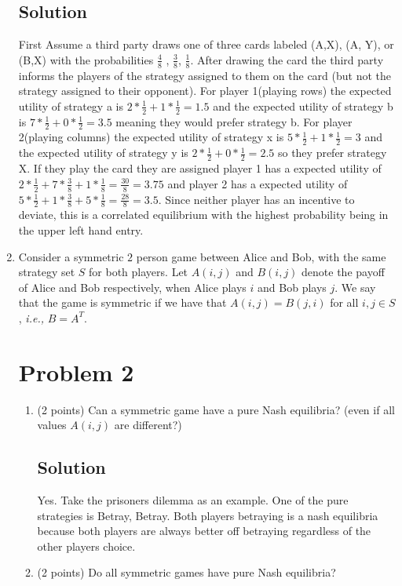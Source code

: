 \documentclass[11pt]{article}
\begin{document}
\begin{enumerate}
\subsection{Solution}
First Assume a third party draws one of three cards labeled (A,X), (A, Y), or (B,X) with the probabilities $\frac{4}{8}$ , $\frac{3}{8}$, $\frac{1}{8}$. After drawing the card the third party informs the players of the strategy assigned to them on the card (but not the strategy assigned to their opponent). For player 1(playing rows) the expected utility of strategy a is $2*\frac{1}{2} + 1*\frac{1}{2} = 1.5$ and the expected utility of strategy b is $7*\frac{1}{2} + 0*\frac{1}{2} = 3.5$ meaning they would prefer strategy b. For player 2(playing columns) the expected utility of strategy x is $5*\frac{1}{2} + 1*\frac{1}{2} = 3$ and the expected utility of strategy y is $2*\frac{1}{2} + 0*\frac{1}{2} = 2.5$ so they prefer strategy X. If they play the card they are assigned player 1 has a expected utility of $2*\frac{1}{2} + 7*\frac{3}{8} + 1*\frac{1}{8} = \frac{30}{8} = 3.75$ and player 2 has a expected utility of $5*\frac{1}{2} + 1*\frac{3}{8} + 5*\frac{1}{8} = \frac{28}{8} = 3.5$. Since neither player has an incentive to deviate, this is a correlated equilibrium with the highest probability being in the upper left hand entry.
\item Consider a symmetric $2$ person game between Alice and Bob, with the same strategy set $S$ for both players. Let $A(i, j)$ and $B(i,j)$ denote the payoff of Alice and Bob respectively, when Alice plays $i$ and Bob plays $j$. We say that the game is symmetric if we have that $A(i,j) = B(j,i)$ for all $i,j \in S$, {\em i.e.,} $B=A^T$.
\section{Problem 2}
\begin{enumerate}
    \item (2 points) Can a symmetric game have a pure Nash equilibria? (even if all values $A(i,j)$ are different?)
    \subsection{Solution}
    Yes. Take the prisoners dilemma as an example. One of the pure strategies is Betray, Betray. Both players betraying is a nash equilibria because both players are always better off betraying regardless of the other players choice. 
    \item (2 points) Do all symmetric games have pure Nash equilibria?

\end{enumerate}
\end{enumerate}
\end{document}
